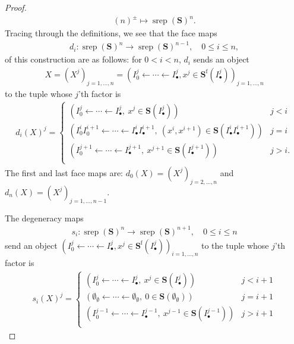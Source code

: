 \documentclass[12pt, reqno]{amsart}
\theoremstyle{plain}
\theoremstyle{definition}
\begin{document}
\begin{proof}
\begin{align*}
(n)^\pm\mapsto \operatorname{srep}(\mathbf{S})^n.
\end{align*}
Tracing through the definitions, we see that the face maps
\begin{align*}
d_i\colon \operatorname{srep}(\mathbf{S})^n\longrightarrow \operatorname{srep}(\mathbf{S})^{n-1}, \quad 0\leq i\leq n,
\end{align*}
of this construction are as follows: for $0<i<n$, $d_i$ sends an object 
\begin{align*}
X=(X^j)_{j=1,\ldots,n}=(I^j_0\leftarrow \cdots \leftarrow I^j_\bullet, x^j\in \mathbf{S}^{\operatorname{f}}(I^j_\bullet))_{j=1,\ldots,n}
\end{align*}
to the tuple whose $j$'th factor is
\begin{align*}
d_i(X)^j=\begin{cases}
(I^j_0\leftarrow \cdots \leftarrow I^j_\bullet,\  x^j\in \mathbf{S}(I^j_\bullet)) & j<i \\
(I^i_0I^{i+1}_0\leftarrow \cdots \leftarrow I^i_\bullet I^{i+1}_\bullet,\ (x^i,x^{i+1})\in \mathbf{S}(I^i_\bullet I^{i+1}_\bullet)) & j=i \\
(I^{j+1}_0\leftarrow \cdots \leftarrow I^{j+1}_\bullet,\ x^{j+1}\in \mathbf{S}(I^{j+1}_\bullet)) & j>i. \\
\end{cases}
\end{align*}
The first and last face maps are: $d_0(X)=(X^j)_{j=2,\ldots,n}$ and $d_n(X)=(X^j)_{j=1,\ldots,n-1}$.

The degeneracy maps
\begin{align*}
s_i\colon \operatorname{srep}(\mathbf{S})^n\longrightarrow \operatorname{srep}(\mathbf{S})^{n+1}, \quad 0\leq i\leq n
\end{align*}
send an object $(I^j_0\leftarrow \cdots \leftarrow I^j_\bullet, x^j\in \mathbf{S}^{\operatorname{f}}(I^j_\bullet))_{i=1,\ldots,n}$ to the tuple whose $j$'th factor is
\begin{align*}
s_i(X)^j=\begin{cases}
(I^j_0\leftarrow \cdots \leftarrow I^j_\bullet,\ x^j\in \mathbf{S}(I^j_\bullet)) & j<i+1 \\
(\emptyset_\emptyset\leftarrow \cdots \leftarrow \emptyset_\emptyset,\ 0 \in \mathbf{S}(\emptyset_\emptyset)) & j=i+1 \\
(I^{j-1}_0\leftarrow \cdots \leftarrow I^{j-1}_\bullet,\ x^{j-1}\in \mathbf{S}(I^{j-1}_\bullet)) & j>i+1 \\
\end{cases}
\end{align*}


\end{proof}
\end{document}
